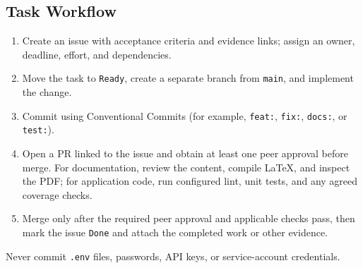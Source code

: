 \subsection{Task Workflow}
\begin{enumerate}
  \item Create an issue with acceptance criteria and evidence links; assign an owner, deadline, effort, and dependencies.
  \item Move the task to \texttt{Ready}, create a separate branch from \texttt{main}, and implement the change.
  \item Commit using Conventional Commits (for example, \texttt{feat:}, \texttt{fix:}, \texttt{docs:}, or \texttt{test:}).
  \item Open a PR linked to the issue and obtain at least one peer approval before merge. For documentation, review the content, compile LaTeX, and inspect the PDF; for application code, run configured lint, unit tests, and any agreed coverage checks.
  \item Merge only after the required peer approval and applicable checks pass, then mark the issue \texttt{Done} and attach the completed work or other evidence.
\end{enumerate}

Never commit \texttt{.env} files, passwords, API keys, or service-account credentials.

\clearpage